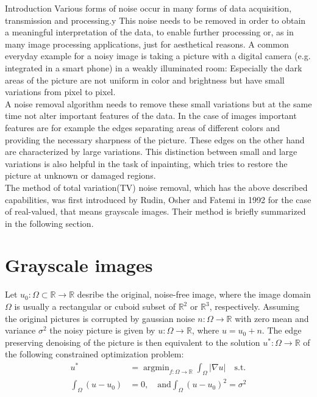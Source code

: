 \begin{chapter}{Introduction}
\label{ch:introduction}
Various forms of noise occur in many forms of data acquisition, transmission and processing.y
This noise needs to be removed in order to obtain a meaningful interpretation of the data, to enable further processing or, as in many image processing 
applications, just for aesthetical reasons. A common everyday example for a noisy image is taking a picture with a digital camera (e.g. integrated in a smart phone) in a weakly illuminated room:
Especially the dark areas of the picture are not uniform in color and brightness but have small variations from pixel to pixel.\\

A noise removal algorithm needs to remove these small variations but at the same time not alter important features of the data. In the case of images important features are for example 
the edges separating areas of different colors and providing the necessary sharpness of the picture. These edges on the other hand are characterized by large variations. This distinction
between small and large variations is also helpful in the task of inpainting, which tries to restore the picture at unknown or damaged regions.\\

The method of total variation(TV) noise removal, which has the above described capabilities, was first introduced by Rudin, Osher and Fatemi \cite{RudinOsher} in 1992
for the case of real-valued, that means grayscale images. Their method is briefly summarized in the following section.

\section{Grayscale images}
Let $u_0: \Omega\subset \mathbb{R}\to \mathbb{R}$ desribe the original, noise-free image, where the image domain $\Omega$ is usually a rectangular or cuboid subset of $\mathbb{R}^2$ or $\mathbb{R}^3$, respectively. 
Assuming the original pictures is corrupted by gaussian noise $n: \Omega\to\mathbb{R}$ with zero mean and variance $\sigma^2$ the noisy picture is given by $u: \Omega\to \mathbb{R}$, where
$u = u_0 + n$. The edge preserving denoising of the picture is then equivalent to the solution $u^* :\Omega\to \mathbb{R}$ of the following constrained optimization problem:
\begin{align}
    \label{osher_opt}
    u^* &= \operatorname{argmin}_{f: \Omega\to \mathbb{R}}\int_\Omega\left\vert\nabla u\right\vert  \quad\text{s.t.}\\
    \int_\Omega(u-u_0) &= 0, \quad\text{and} \int_\Omega(u-u_0)^2 = \sigma^2
\end{align}


\end{chapter}
